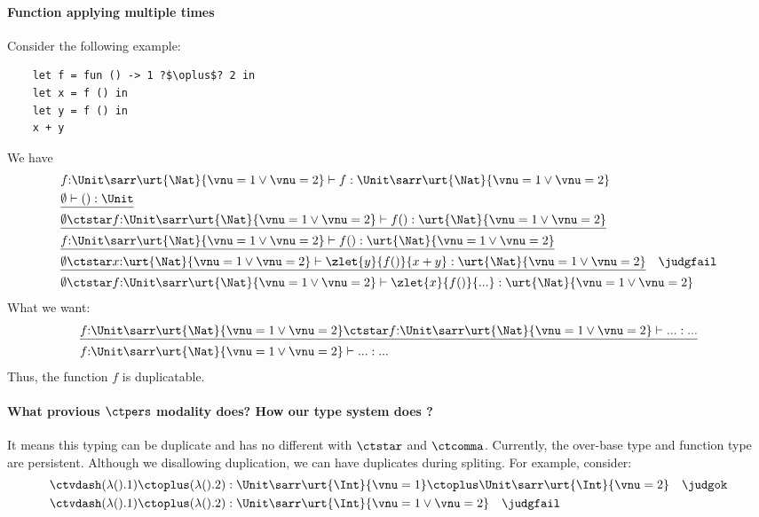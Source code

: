 \paragraph{Function applying multiple times} Consider the following example:
\begin{verbatim}
    let f = fun () -> 1 ?$\oplus$? 2 in
    let x = f () in
    let y = f () in
    x + y
\end{verbatim}
We have
\begin{align*}
  &f{:}\Unit\sarr\urt{\Nat}{\vnu = 1 \lor \vnu = 2} \vdash f : \Unit\sarr\urt{\Nat}{\vnu = 1 \lor \vnu = 2}
  \\&\underline{\emptyset \vdash () : \Unit}
  \\&\underline{\emptyset \ctstar f{:}\Unit\sarr\urt{\Nat}{\vnu = 1 \lor \vnu = 2} \vdash f(): \urt{\Nat}{\vnu = 1 \lor \vnu = 2}}
  \\&\underline{f{:}\Unit\sarr\urt{\Nat}{\vnu = 1 \lor \vnu = 2} \vdash f(): \urt{\Nat}{\vnu = 1 \lor \vnu = 2}}
  \\&\underline{\emptyset \ctstar x{:}\urt{\Nat}{\vnu = 1 \lor \vnu = 2} \vdash \zlet{y}{f()}{ x + y}: \urt{\Nat}{\vnu = 1 \lor \vnu = 2}} \quad \judgfail
  \\&\emptyset \ctstar f{:}\Unit\sarr\urt{\Nat}{\vnu = 1 \lor \vnu = 2} \vdash \zlet{x}{f()}{ ...}: \urt{\Nat}{\vnu = 1 \lor \vnu = 2}
\end{align*}\noindent
What we want:
\begin{align*}
  &\underline{f{:}\Unit\sarr\urt{\Nat}{\vnu = 1 \lor \vnu = 2} \ctstar f{:}\Unit\sarr\urt{\Nat}{\vnu = 1 \lor \vnu = 2} \vdash ... : ...} 
  \\&f{:}\Unit\sarr\urt{\Nat}{\vnu = 1 \lor \vnu = 2} \vdash ... : ...
\end{align*}\noindent
Thus, the function $f$ is duplicatable.

\paragraph{What provious $\ctpers$ modality does? How our type system does ?} It means this typing can be duplicate and has no different with $\ctstar$ and $\ctcomma$. Currently, the over-base type and function type are persistent. Although we disallowing duplication, we can have duplicates during spliting. For example, consider:
\begin{align*}
  &\ctvdash (\lambda ().1) \ctoplus (\lambda ().2) : \Unit \sarr \urt{\Int}{\vnu = 1} \ctoplus \Unit \sarr \urt{\Int}{\vnu = 2} \quad \judgok 
  \\&\ctvdash (\lambda ().1) \ctoplus (\lambda ().2) : \Unit \sarr \urt{\Int}{\vnu = 1 \lor \vnu = 2} \quad \judgfail
\end{align*}\noindent

